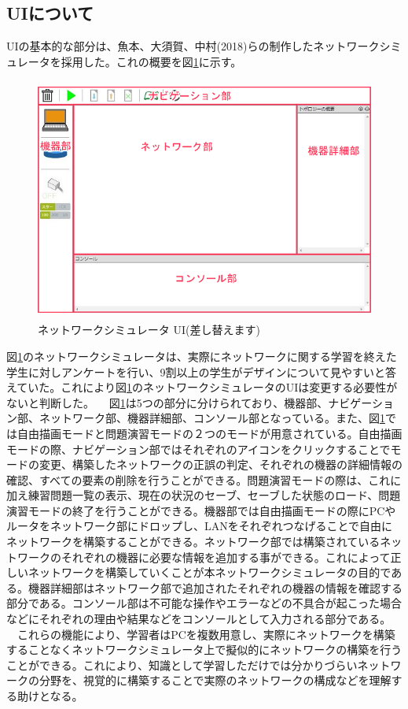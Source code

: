 \subsection{UIについて}
\label{tag:ui}
UIの基本的な部分は、魚本、大須賀、中村(2018)らの制作したネットワークシミュレータを採用した。これの概要を図\ref{fig:simu}に示す。

\begin{figure}[htbp]
  \begin{center}
    \includegraphics[clip,width=12.0cm,height=8.0cm]{img/simu.png}
    \caption{ネットワークシミュレータ UI(差し替えます)}
    \label{fig:simu}
  \end{center}
\end{figure}

図\ref{fig:simu}のネットワークシミュレータは、実際にネットワークに関する学習を終えた学生に対しアンケートを行い、9割以上の学生がデザインについて見やすいと答えていた。これにより図\ref{fig:simu}のネットワークシミュレータのUIは変更する必要性がないと判断した。
　図\ref{fig:simu}は5つの部分に分けられており、機器部、ナビゲーション部、ネットワーク部、機器詳細部、コンソール部となっている。また、図\ref{fig:simu}では自由描画モードと問題演習モードの２つのモードが用意されている。自由描画モードの際、ナビゲーション部ではそれぞれのアイコンをクリックすることでモードの変更、構築したネットワークの正誤の判定、それぞれの機器の詳細情報の確認、すべての要素の削除を行うことができる。問題演習モードの際は、これに加え練習問題一覧の表示、現在の状況のセーブ、セーブした状態のロード、問題演習モードの終了を行うことができる。機器部では自由描画モードの際にPCやルータをネットワーク部にドロップし、LANをそれぞれつなげることで自由にネットワークを構築することができる。ネットワーク部では構築されているネットワークのそれぞれの機器に必要な情報を追加する事ができる。これによって正しいネットワークを構築していくことが本ネットワークシミュレータの目的である。機器詳細部はネットワーク部で追加されたそれぞれの機器の情報を確認する部分である。コンソール部は不可能な操作やエラーなどの不具合が起こった場合などにそれぞれの理由や結果などをコンソールとして入力される部分である。\\
　これらの機能により、学習者はPCを複数用意し、実際にネットワークを構築することなくネットワークシミュレータ上で擬似的にネットワークの構築を行うことができる。これにより、知識として学習しただけでは分かりづらいネットワークの分野を、視覚的に構築することで実際のネットワークの構成などを理解する助けとなる。
